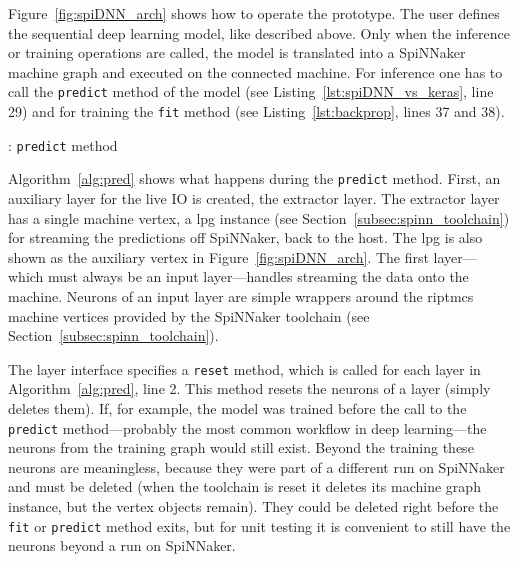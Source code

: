 \documentclass[]{article}
\begin{document}
Figure~\ref{fig:spiDNN_arch} shows how to operate the prototype.
The user defines the sequential deep learning model, like described
above.
Only when the inference or training operations are called, the
model is translated into a SpiNNaker machine graph and executed on the
connected machine.
For inference one has to call the \texttt{predict} method of the model
(see Listing~\ref{lst:spiDNN_vs_keras}, line 29)
and for training the \texttt{fit} method
(see Listing~\ref{lst:backprop}, lines 37 and 38).

\begin{algorithm} %
  \caption{: \texttt{predict} method}
  \label{alg:pred}

  \begin{algorithmic}[1]
  \end{algorithmic}
\end{algorithm} %

Algorithm~\ref{alg:pred} shows what happens during the
\texttt{predict} method.
First, an auxiliary layer for the live IO is created, the extractor
layer.
The extractor layer has a single machine vertex, a \acrshort{lpg} instance
(see Section~\ref{subsec:spinn_toolchain}) for streaming the
predictions off SpiNNaker, back to the host.
The \acrshort{lpg} is also shown as the auxiliary vertex in
Figure~\ref{fig:spiDNN_arch}.
The first layer---which must always be an input layer---handles
streaming the data onto the machine.
Neurons of an input layer are simple wrappers around the \acrshort{riptmcs}
machine vertices provided by the SpiNNaker toolchain (see
Section~\ref{subsec:spinn_toolchain}).

The layer interface specifies a \texttt{reset} method, which is
called for each layer in Algorithm~\ref{alg:pred}, line 2.
This method resets the neurons of a layer (simply deletes them).
If, for example, the model was trained before the call to the
\texttt{predict} method---probably the most common workflow in deep
learning---the neurons from the training graph would still exist.
Beyond the training these neurons are meaningless, because they were
part of a different run on SpiNNaker and must be deleted (when the
toolchain is reset it deletes its machine graph instance, but the
vertex objects remain).
They could be deleted right before the \texttt{fit} or
\texttt{predict} method exits, but for unit testing it is convenient
to still have the neurons beyond a run on SpiNNaker.
\end{document}
